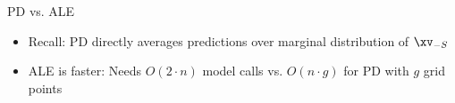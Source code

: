 \documentclass[10pt,compress,t,notes=noshow, xcolor=table]{beamer}
\begin{document}
\begin{frame}{PD vs. ALE}
    \lz
    \begin{itemize}
    \item<1-> Recall: PD directly averages predictions over marginal distribution of $\xv_{-S}$
    \item<1-> ALE is faster: Needs $O(2 \cdot n)$ model calls vs. $O(n \cdot g)$ for PD with $g$ grid points
\end{itemize}
\end{frame}
\end{document}
